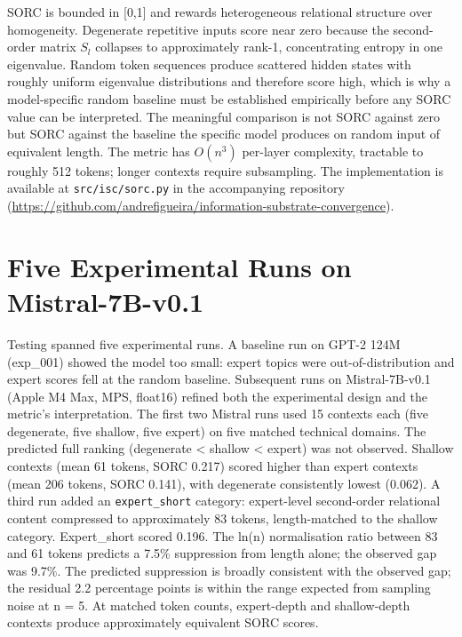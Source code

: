 \documentclass[12pt]{article}
\begin{document}
SORC is bounded in {[}0,1{]} and rewards heterogeneous relational
structure over homogeneity. Degenerate repetitive inputs score near zero
because the second-order matrix \(S_l\) collapses to approximately
rank-1, concentrating entropy in one eigenvalue. Random token sequences
produce scattered hidden states with roughly uniform eigenvalue
distributions and therefore score high, which is why a model-specific
random baseline must be established empirically before any SORC value
can be interpreted. The meaningful comparison is not SORC against zero
but SORC against the baseline the specific model produces on random
input of equivalent length. The metric has $O(n^3)$ per-layer complexity,
tractable to roughly 512 tokens; longer contexts require subsampling.
The implementation is available at \texttt{src/isc/sorc.py} in the accompanying repository (\url{https://github.com/andrefigueira/information-substrate-convergence}).

\section{Five Experimental Runs on
Mistral-7B-v0.1}\label{five-experimental-runs-on-mistral-7b-v0.1}

Testing spanned five experimental runs. A baseline run on GPT-2 124M
(exp\_001) showed the model too small: expert topics were
out-of-distribution and expert scores fell at the random baseline.
Subsequent runs on Mistral-7B-v0.1 (Apple M4 Max, MPS, float16) refined
both the experimental design and the metric's interpretation. The first
two Mistral runs used 15 contexts each (five degenerate, five shallow,
five expert) on five matched technical domains. The predicted full
ranking (degenerate \textless{} shallow \textless{} expert) was not
observed. Shallow contexts (mean 61 tokens, SORC 0.217) scored higher
than expert contexts (mean 206 tokens, SORC 0.141), with degenerate
consistently lowest (0.062). A third run added an \texttt{expert\_short}
category: expert-level second-order relational content compressed to
approximately 83 tokens, length-matched to the shallow category.
Expert\_short scored 0.196. The ln(n) normalisation ratio between 83 and
61 tokens predicts a 7.5\% suppression from length alone; the observed
gap was 9.7\%. The predicted suppression is broadly consistent with the
observed gap; the residual 2.2 percentage points is within the range
expected from sampling noise at n = 5. At matched token counts,
expert-depth and shallow-depth contexts produce approximately equivalent
SORC scores.
\end{document}
